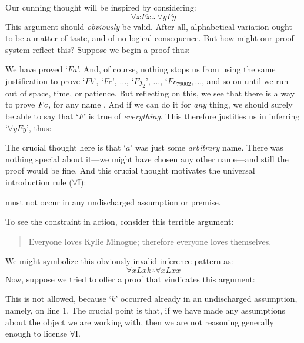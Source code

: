 Our cunning thought will be inspired by considering:
$$\forall x Fx \therefore\ \forall y Fy$$
This argument should \emph{obviously} be valid. After all, alphabetical variation ought to be a matter of taste, and of no logical consequence. But how might our proof system reflect this? Suppose we begin a proof thus:
\begin{fitchproof}
	 
\end{fitchproof}
We have proved `$Fa$'. And, of course, nothing stops us from using the same justification to prove `$Fb$', `$Fc$', $\ldots$, `$Fj_2$', $\ldots$, `$Fr_{79002}, \ldots$, and so on until we run out of space, time, or patience. But reflecting on this, we see that there is a way to prove $Fc$, for any name . And if we can do it for \emph{any} thing, we should surely be able to say that `$F$' is true of \emph{everything}. This therefore justifies us in inferring `$\forall y Fy$', thus:
\begin{fitchproof}
	 
	 
\end{fitchproof}
The crucial thought here is that `$a$' was just some \emph{arbitrary} name. There was nothing special about it---we might have chosen any other name---and still the proof would be fine. And this crucial thought motivates the universal introduction rule ($\forall$I):
\begin{highlighted}
\begin{fitchproof}
	 
\end{fitchproof}
	 must not occur in any undischarged assumption or premise.\\
	\end{highlighted}


To see the constraint in action, consider this terrible argument:
	\begin{quote}
		Everyone loves Kylie Minogue; therefore everyone loves themselves.
	\end{quote}
We might symbolize this obviously invalid inference pattern as:
$$\forall x Lxk \therefore \forall x Lxx$$
Now, suppose we tried to offer a proof that vindicates this argument:
\begin{fitchproof}
	 
	 
\end{fitchproof}\noindent
This is not allowed, because `$k$' occurred already in an undischarged assumption, namely, on line 1. The crucial point is that, if we have made any assumptions about the object we are working with, then we are not reasoning generally enough to license $\forall$I.

